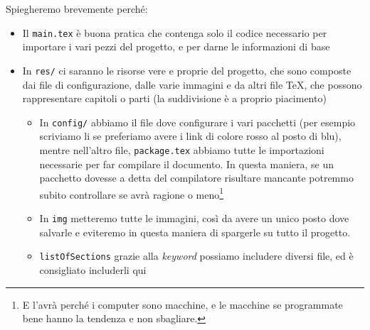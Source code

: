 Spiegheremo brevemente perché:
\begin{itemize}
  \item Il \texttt{main.tex} è buona pratica che contenga solo il codice 
necessario per importare i vari pezzi del progetto, e per darne le informazioni 
di base
  \item In \texttt{res/} ci saranno le risorse vere e proprie del progetto, che 
sono composte dai file di configurazione, dalle varie immagini e da altri file 
TeX, che possono rappresentare capitoli o parti (la suddivisione è a proprio 
piacimento)
  \begin{itemize}
   \item In \texttt{config/} abbiamo il file dove configurare i vari pacchetti 
(per esempio scriviamo li se preferiamo avere i link di colore rosso al posto 
di blu), mentre nell'altro file, \texttt{package.tex} abbiamo tutte le 
importazioni necessarie per far compilare il documento. In questa maniera, se 
un pacchetto dovesse a detta del compilatore risultare mancante potremmo subito 
controllare se avrà ragione o meno\footnote{E l'avrà perché i computer sono 
macchine, e le macchine se programmate bene hanno la tendenza e non sbagliare.}
  \item In \texttt{img} metteremo tutte le immagini, così da avere un unico 
posto dove salvarle e eviteremo in questa maniera di spargerle su tutto il 
progetto.
  \item \texttt{listOfSections} grazie alla \textit{keyword} \verb!! 
possiamo includere diversi file, ed è consigliato includerli qui %
  \end{itemize}

\end{itemize}

